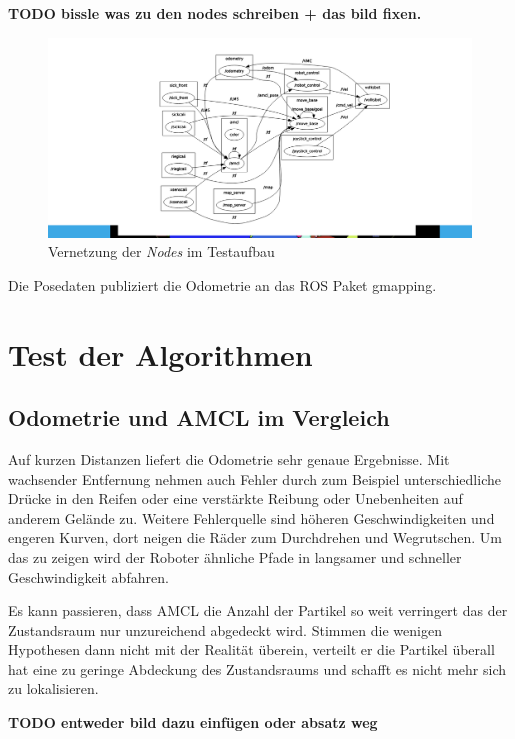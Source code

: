\documentclass[11pt,a4paper]{article}
\begin{document}
{{	\textbf{TODO bissle was zu den nodes schreiben + das bild fixen.}
	\begin{figure}[h]
		\includegraphics[trim=9cm 1cm 7cm 1cm , clip= true,width=\textwidth]{pictures/node_graph.png}
		\caption{Vernetzung der \textit{Nodes} im Testaufbau}
	\end{figure}
	
	
	
	 Die Posedaten publiziert die Odometrie an das ROS Paket gmapping.	
	
	
} 

\section{Test der Algorithmen} 
\subsection{Odometrie und AMCL im Vergleich}

Auf kurzen Distanzen liefert die Odometrie sehr genaue Ergebnisse. Mit wachsender Entfernung nehmen auch Fehler durch zum Beispiel unterschiedliche Dr\"ucke in den Reifen oder eine verst\"arkte Reibung oder Unebenheiten auf anderem Gel\"ande zu. Weitere Fehlerquelle sind h\"oheren Geschwindigkeiten und engeren Kurven, dort neigen die R\"ader zum Durchdrehen und Wegrutschen. Um das zu zeigen wird der Roboter \"ahnliche Pfade in langsamer und schneller Geschwindigkeit abfahren. 	

Es kann passieren, dass AMCL die Anzahl der Partikel so weit verringert das der Zustandsraum nur unzureichend abgedeckt wird. Stimmen die wenigen Hypothesen dann nicht mit der Realit\"at \"uberein, verteilt er die Partikel \"uberall hat eine zu geringe Abdeckung des Zustandsraums und schafft es nicht mehr sich zu lokalisieren.

\textbf{TODO entweder bild dazu einfügen oder absatz weg}

}
\end{document}
